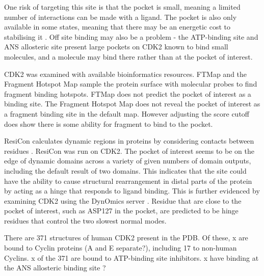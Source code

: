 One risk of targeting this site is that the pocket is small, meaning a limited number of interactions can be made with a ligand.
The pocket is also only available in some states, meaning that there may be an energetic cost to stabilising it \cite{Oleinikovas2016}.
Off site binding may also be a problem - the ATP-binding site and ANS allosteric site present large pockets on CDK2 known to bind small molecules, and a molecule may bind there rather than at the pocket of interest.

CDK2 was examined with available bioinformatics resources.
FTMap \cite{Kozakov2015} and the Fragment Hotspot Map \cite{Radoux2016} sample the protein surface with molecular probes to find fragment binding hotspots.
FTMap \cite{Kozakov2015} does not predict the pocket of interest as a binding site.
The Fragment Hotspot Map \cite{Radoux2016} does not reveal the pocket of interest as a fragment binding site in the default map.
However adjusting the score cutoff does show there is some ability for fragment to bind to the pocket.

ResiCon calculates dynamic regions in proteins by considering contacts between residues \cite{Dziubinski2016}.
ResiCon was run on CDK2.
The pocket of interest seems to be on the edge of dynamic domains across a variety of given numbers of domain outputs, including the default result of two domains.
This indicates that the site could have the ability to cause structural rearrangement in distal parts of the protein by acting as a hinge that responds to ligand binding.
This is further evidenced by examining CDK2 using the DynOmics server \cite{Li2017}.
Residue that are close to the pocket of interest, such as ASP127 in the pocket, are predicted to be hinge residues that control the two slowest normal modes.


There are 371 structures of human CDK2 present in the PDB.
Of these, x are bound to Cyclin proteins (A and E separate?), including 17 to non-human Cyclins.
x of the 371 are bound to ATP-binding site inhibitors. %
x have binding at the ANS allosteric binding site \cite{Betzi2011}? %

